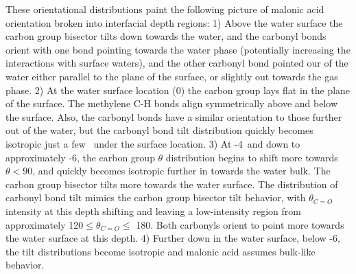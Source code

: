 These orientational distributions paint the following picture of malonic acid orientation broken into interfacial depth regions: 1) Above the water surface the carbon group bisector tilts down towards the water, and the carbonyl bonds orient with one bond pointing towards the water phase (potentially increasing the interactions with surface waters), and the other carbonyl bond pointed our of the water either parallel to the plane of the surface, or slightly out towards the gas phase. 2) At the water surface location (0\angs) the carbon group lays flat in the plane of the surface. The methylene C-H bonds align symmetrically above and below the surface. Also, the carbonyl bonds have a similar orientation to those further out of the water, but the carbonyl bond tilt distribution quickly becomes isotropic just a few \angs~under the surface location. 3) At -4\angs~and down to approximately -6\angs, the carbon group $\theta$ distribution begins to shift more towards $\theta<90$\textdegree, and quickly becomes isotropic further in towards the water bulk. The carbon group bisector tilts more towards the water surface. The distribution of carbonyl bond tilt mimics the carbon group bisector tilt behavior, with $\theta_{C=O}$ intensity at this depth shifting and leaving a low-intensity region from approximately 120\textdegree $\le \theta_{C=O} \le$ 180\textdegree. Both carbonyls orient to point more towards the water surface at this depth. 4) Further down in the water surface, below -6\angs, the tilt distributions become isotropic and malonic acid assumes bulk-like behavior.
